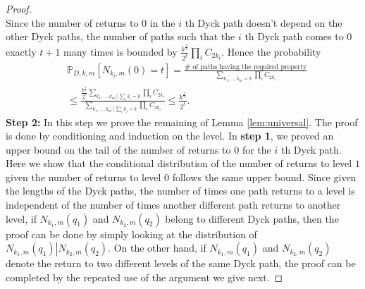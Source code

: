 \documentclass[12pt]{article}
\numberwithin{equation}{section}
\numberwithin{equation}{section}
\theoremstyle{definition}
\renewcommand{\1}{\bf 1}
\begin{document}
\begin{proof}
\begin{equation}
\end{equation}
Since the number of returns to $0$ in the $i$ th Dyck path doesn't depend on the other Dyck paths, the number of paths such that the $i$ th Dyck path comes to $0$ exactly $t+1$ many times is bounded by $\frac{k^{\frac{3}{2}}}{2^{t}} \prod_{i} C_{2k_{i}}$. Hence the probability
\begin{equation}
\begin{split}
&\mathbb{P}_{D,k,m}\left[ N_{k_{i},m}(0)=t \right]= \frac{\# \text{ of paths having the required property}}{\sum_{k_{1},\ldots, k_{m}=k} \prod_{i} C_{2k_{i}}}\\
&\le \frac{\frac{k^{\frac{3}{2}}}{2^{t}} \sum_{k_{1},\ldots, k_{m}~|~ \sum_{i}k_{i}=k}\prod_{i} C_{2k_{i}}}{\sum_{k_{1},\ldots, k_{m}~|~ \sum_{i}k_{i}=k} \prod_{i} C_{2k_{i}}}\le \frac{k^{\frac{2}{3}}}{2^{t}}.
\end{split}
\end{equation}
\textbf{Step 2:} In this step we prove the remaining of Lemma \ref{lem:universal}. The proof is done by conditioning and induction on the level. In \textbf{step 1}, we proved an upper bound on the tail of the number of returns to $0$ for the $i$ th Dyck path. Here we show that the conditional distribution of the number of returns to level $1$ given the number of returns to level $0$ follows the same upper bound. Since given the lengths of the Dyck paths, the number of times one path returns to a level is independent of the number of times another different path returns to another level, if $N_{k_{1},m}(q_{1})$ and $N_{k_{2},m}(q_{2})$ belong to different Dyck paths, then the proof can be done by simply looking at the distribution of $N_{k_{1},m}(q_{1}) \left|N_{k_{2},m}(q_{2}) \right.$. On the other hand, if $N_{k_{1},m}(q_{1})$ and $N_{k_{2},m}(q_{2})$ denote the return to two different levels of the same Dyck path, the proof can be completed by the repeated use of the argument we give next.


\end{proof}
\end{document}
